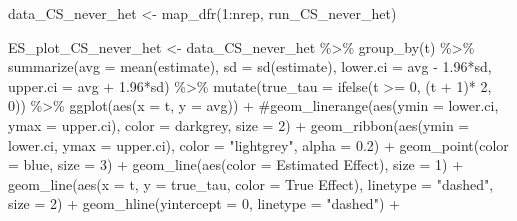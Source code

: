 \documentclass[
  letterpaper,
  DIV=11,
  numbers=noendperiod]{scrartcl}
\newenvironment{Shaded}{\begin{snugshade}}{\end{snugshade}}
\newcommand{\AttributeTok}[1]{\textcolor[rgb]{0.40,0.45,0.13}{#1}}
\newcommand{\CommentTok}[1]{\textcolor[rgb]{0.37,0.37,0.37}{#1}}
\newcommand{\DecValTok}[1]{\textcolor[rgb]{0.68,0.00,0.00}{#1}}
\newcommand{\FloatTok}[1]{\textcolor[rgb]{0.68,0.00,0.00}{#1}}
\newcommand{\FunctionTok}[1]{\textcolor[rgb]{0.28,0.35,0.67}{#1}}
\newcommand{\NormalTok}[1]{\textcolor[rgb]{0.00,0.23,0.31}{#1}}
\newcommand{\OtherTok}[1]{\textcolor[rgb]{0.00,0.23,0.31}{#1}}
\newcommand{\SpecialCharTok}[1]{\textcolor[rgb]{0.37,0.37,0.37}{#1}}
\newcommand{\StringTok}[1]{\textcolor[rgb]{0.13,0.47,0.30}{#1}}
\begin{document}
\begin{Shaded}
\begin{Highlighting}[]
\NormalTok{data\_CS\_never\_het }\OtherTok{\textless{}{-}} \FunctionTok{map\_dfr}\NormalTok{(}\DecValTok{1}\SpecialCharTok{:}\NormalTok{nrep, run\_CS\_never\_het)}

\NormalTok{ES\_plot\_CS\_never\_het }\OtherTok{\textless{}{-}}\NormalTok{ data\_CS\_never\_het }\SpecialCharTok{\%\textgreater{}\%} 
  \FunctionTok{group\_by}\NormalTok{(t) }\SpecialCharTok{\%\textgreater{}\%} 
  \FunctionTok{summarize}\NormalTok{(}\AttributeTok{avg =} \FunctionTok{mean}\NormalTok{(estimate),}
            \AttributeTok{sd =} \FunctionTok{sd}\NormalTok{(estimate),}
            \AttributeTok{lower.ci =}\NormalTok{ avg }\SpecialCharTok{{-}} \FloatTok{1.96}\SpecialCharTok{*}\NormalTok{sd,}
            \AttributeTok{upper.ci =}\NormalTok{ avg }\SpecialCharTok{+} \FloatTok{1.96}\SpecialCharTok{*}\NormalTok{sd) }\SpecialCharTok{\%\textgreater{}\%} 
  \FunctionTok{mutate}\NormalTok{(}\AttributeTok{true\_tau =} \FunctionTok{ifelse}\NormalTok{(t }\SpecialCharTok{\textgreater{}=} \DecValTok{0}\NormalTok{, (t }\SpecialCharTok{+} \DecValTok{1}\NormalTok{)}\SpecialCharTok{*} \DecValTok{2}\NormalTok{, }\DecValTok{0}\NormalTok{)) }\SpecialCharTok{\%\textgreater{}\%} 
  \FunctionTok{ggplot}\NormalTok{(}\FunctionTok{aes}\NormalTok{(}\AttributeTok{x =}\NormalTok{ t, }\AttributeTok{y =}\NormalTok{ avg)) }\SpecialCharTok{+} 
  \CommentTok{\#geom\_linerange(aes(ymin = lower.ci, ymax = upper.ci), color = \textquotesingle{}darkgrey\textquotesingle{}, size = 2) + }
  \FunctionTok{geom\_ribbon}\NormalTok{(}\FunctionTok{aes}\NormalTok{(}\AttributeTok{ymin =}\NormalTok{ lower.ci, }\AttributeTok{ymax =}\NormalTok{ upper.ci), }\AttributeTok{color =} \StringTok{"lightgrey"}\NormalTok{, }\AttributeTok{alpha =} \FloatTok{0.2}\NormalTok{) }\SpecialCharTok{+}
  \FunctionTok{geom\_point}\NormalTok{(}\AttributeTok{color =} \StringTok{\textquotesingle{}blue\textquotesingle{}}\NormalTok{, }\AttributeTok{size =} \DecValTok{3}\NormalTok{) }\SpecialCharTok{+} 
   \FunctionTok{geom\_line}\NormalTok{(}\FunctionTok{aes}\NormalTok{(}\AttributeTok{color =} \StringTok{\textquotesingle{}Estimated Effect\textquotesingle{}}\NormalTok{), }\AttributeTok{size =} \DecValTok{1}\NormalTok{) }\SpecialCharTok{+} 
   \FunctionTok{geom\_line}\NormalTok{(}\FunctionTok{aes}\NormalTok{(}\AttributeTok{x =}\NormalTok{ t, }\AttributeTok{y =}\NormalTok{ true\_tau, }\AttributeTok{color =} \StringTok{\textquotesingle{}True Effect\textquotesingle{}}\NormalTok{), }\AttributeTok{linetype =} \StringTok{"dashed"}\NormalTok{, }\AttributeTok{size =} \DecValTok{2}\NormalTok{) }\SpecialCharTok{+} 
  \FunctionTok{geom\_hline}\NormalTok{(}\AttributeTok{yintercept =} \DecValTok{0}\NormalTok{, }\AttributeTok{linetype =} \StringTok{"dashed"}\NormalTok{) }\SpecialCharTok{+} 

\end{Highlighting}
\end{Shaded}
\end{document}

